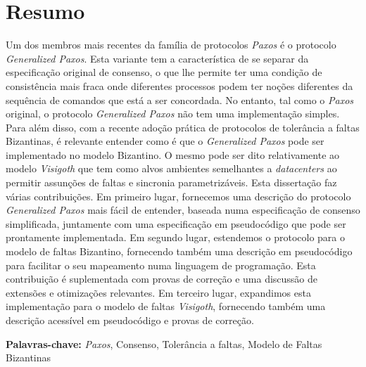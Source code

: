 
\section*{Resumo}


Um dos membros mais recentes da família de protocolos \textit{Paxos} é o protocolo \textit{Generalized Paxos}. Esta variante tem a característica de se separar da especificação original de consenso, o que lhe permite ter uma condição de consistência mais fraca onde diferentes processos podem ter noções diferentes da sequência de comandos que está a ser concordada. No entanto, tal como o \textit{Paxos} original, o protocolo \textit{Generalized Paxos} não tem uma implementação simples. Para além disso, com a recente adoção prática de protocolos de tolerância a faltas Bizantinas, é relevante entender como é que o \textit{Generalized Paxos} pode ser implementado no modelo Bizantino. O mesmo pode ser dito relativamente ao modelo \textit{Visigoth} que tem como alvos ambientes semelhantes a \textit{datacenters} ao permitir assunções de faltas e sincronia parametrizáveis. Esta dissertação faz várias contribuições. Em primeiro lugar, fornecemos uma descrição do protocolo \textit{Generalized Paxos} mais fácil de entender, baseada numa especificação de consenso simplificada, juntamente com uma especificação em pseudocódigo que pode ser prontamente implementada. Em segundo lugar, estendemos o protocolo para o modelo de faltas Bizantino, fornecendo também uma descrição em pseudocódigo para facilitar o seu mapeamento numa linguagem de programação. Esta contribuição é suplementada com provas de correção e uma discussão de extensões e otimizações relevantes. Em terceiro lugar, expandimos esta implementação para o modelo de faltas \textit{Visigoth}, fornecendo também uma descrição acessível em pseudocódigo e provas de correção. 

\vfill

\textbf{\Large Palavras-chave:} \textit{Paxos}, Consenso, Tolerância a faltas, Modelo de Faltas Bizantinas

